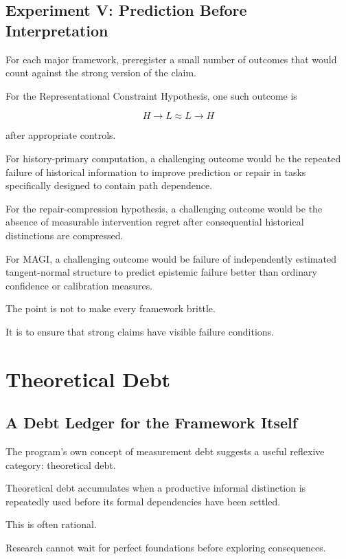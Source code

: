 \documentclass[11pt]{article}
\theoremstyle{remark}
\newcommand{\MAGI}{\textsc{MAGI}}
\begin{document}
\subsection{Experiment V: Prediction Before Interpretation}

For each major framework, preregister a small number of outcomes that would count against the strong version of the claim.

For the Representational Constraint Hypothesis, one such outcome is

\begin{equation}
H\rightarrow L
\approx
L\rightarrow H
\end{equation}

after appropriate controls.

For history-primary computation, a challenging outcome would be the repeated failure of historical information to improve prediction or repair in tasks specifically designed to contain path dependence.

For the repair-compression hypothesis, a challenging outcome would be the absence of measurable intervention regret after consequential historical distinctions are compressed.

For \MAGI{}, a challenging outcome would be failure of independently estimated tangent-normal structure to predict epistemic failure better than ordinary confidence or calibration measures.

The point is not to make every framework brittle.

It is to ensure that strong claims have visible failure conditions.

\section{Theoretical Debt}

\subsection{A Debt Ledger for the Framework Itself}

The program's own concept of measurement debt suggests a useful reflexive category: theoretical debt.

Theoretical debt accumulates when a productive informal distinction is repeatedly used before its formal dependencies have been settled.

This is often rational.

Research cannot wait for perfect foundations before exploring consequences.
\end{document}

